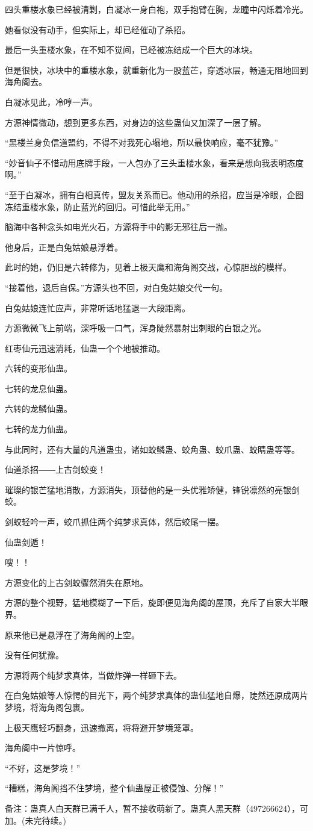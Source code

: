 \begin{this_body}
四头重楼水象已经被清剿，白凝冰一身白袍，双手抱臂在胸，龙瞳中闪烁着冷光。

她看似没有动手，但实际上，却已经催动了杀招。

最后一头重楼水象，在不知不觉间，已经被冻结成一个巨大的冰块。

但是很快，冰块中的重楼水象，就重新化为一股蓝芒，穿透冰层，畅通无阻地回到海角阁去。

白凝冰见此，冷哼一声。

方源神情微动，想到更多东西，对身边的这些蛊仙又加深了一层了解。

“黑楼兰身负信道盟约，不得不对我死心塌地，所以最快响应，毫不犹豫。”

“妙音仙子不惜动用底牌手段，一人包办了三头重楼水象，看来是想向我表明态度啊。”

“至于白凝冰，拥有白相真传，盟友关系而已。他动用的杀招，应当是冷眼，企图冻结重楼水象，防止蓝光的回归。可惜此举无用。”

脑海中各种念头如电光火石，方源将手中的影无邪往后一抛。

他身后，正是白兔姑娘悬浮着。

此时的她，仍旧是六转修为，见着上极天鹰和海角阁交战，心惊胆战的模样。

“接着他，退后自保。”方源头也不回，对白兔姑娘交代一句。

白兔姑娘连忙应声，非常听话地猛退一大段距离。

方源微微飞上前端，深呼吸一口气，浑身陡然暴射出刺眼的白银之光。

红枣仙元迅速消耗，仙蛊一个个地被推动。

六转的变形仙蛊。

七转的龙息仙蛊。

六转的龙鳞仙蛊。

七转的龙力仙蛊。

与此同时，还有大量的凡道蛊虫，诸如蛟鳞蛊、蛟角蛊、蛟爪蛊、蛟睛蛊等等。

仙道杀招――上古剑蛟变！

璀璨的银芒猛地消散，方源消失，顶替他的是一头优雅矫健，锋锐凛然的亮银剑蛟。

剑蛟轻吟一声，蛟爪抓住两个纯梦求真体，然后蛟尾一摆。

仙蛊剑遁！

嗖！！

方源变化的上古剑蛟骤然消失在原地。

方源的整个视野，猛地模糊了一下后，旋即便见海角阁的屋顶，充斥了自家大半眼界。

原来他已是悬浮在了海角阁的上空。

没有任何犹豫。

方源将两个纯梦求真体，当做炸弹一样砸下去。

在白兔姑娘等人惊愕的目光下，两个纯梦求真体的蛊仙猛地自爆，陡然还原成两片梦境，将海角阁包裹。

上极天鹰轻巧翻身，迅速撤离，将将避开梦境笼罩。

海角阁中一片惊呼。

“不好，这是梦境！”

“糟糕，海角阁挡不住梦境，整个仙蛊屋正被侵蚀、分解！”

备注：蛊真人白天群已满千人，暂不接收萌新了。蛊真人黑天群（497266624），可加。(未完待续。)

\end{this_body}

